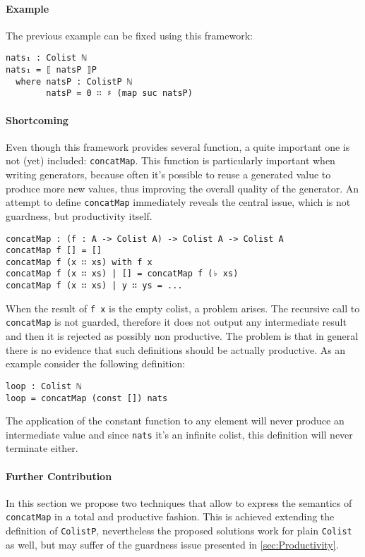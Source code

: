 \documentclass[10pt,a4paper]{article}
\begin{document}
\paragraph{Example}
The previous example can be fixed using this framework:
\begin{verbatim}
nats₁ : Colist ℕ
nats₁ = ⟦ natsP ⟧P
  where natsP : ColistP ℕ
        natsP = 0 ∷ ♯ (map suc natsP)
\end{verbatim}

\paragraph{Shortcoming}
Even though this framework provides several function, a quite important one is not (yet) included: \texttt{concatMap}.
This function is particularly important when writing generators, because often it's possible to reuse a generated value to produce more new values, thus improving the overall quality of the generator.
An attempt to define \texttt{concatMap} immediately reveals the central issue, which is not guardness, but productivity itself.
\begin{verbatim}
concatMap : (f : A -> Colist A) -> Colist A -> Colist A
concatMap f [] = []
concatMap f (x ∷ xs) with f x
concatMap f (x ∷ xs) | [] = concatMap f (♭ xs)
concatMap f (x ∷ xs) | y ∷ ys = ...
\end{verbatim}
When the result of \texttt{f x} is the empty colist, a problem arises.
The recursive call to \texttt{concatMap} is not guarded, therefore it does not output any intermediate result and then it is rejected as possibly non productive.
The problem is that in general there is no evidence that such definitions should be actually productive.
As an example consider the following definition:
\begin{verbatim}
loop : Colist ℕ
loop = concatMap (const []) nats
\end{verbatim}
The application of the constant function to any element will never produce an intermediate value and since \texttt{nats} it's an infinite colist, 
this definition will never terminate either.

\paragraph{Further Contribution}
In this section we propose two techniques that allow to express the semantics of \texttt{concatMap} in a total and productive fashion.
This is achieved extending the definition of \texttt{ColistP}, nevertheless the proposed solutions work for plain \texttt{Colist} as well, but may suffer of the guardness issue presented in \ref{sec:Productivity}. 
\end{document}
